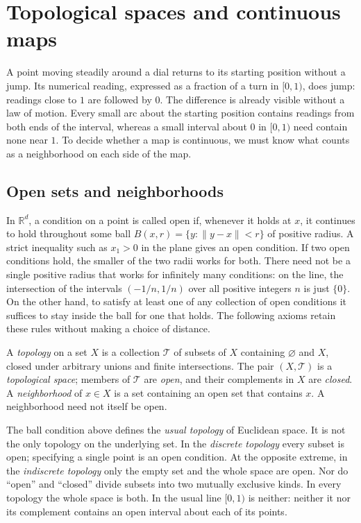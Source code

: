 \chapter{Topological spaces and continuous maps}\label{f:topology}

A point moving steadily around a dial returns to its starting position without a jump. Its numerical reading, expressed as a fraction of a turn in $[0,1)$, does jump: readings close to $1$ are followed by $0$. The difference is already visible without a law of motion. Every small arc about the starting position contains readings from both ends of the interval, whereas a small interval about $0$ in $[0,1)$ need contain none near $1$. To decide whether a map is continuous, we must know what counts as a neighborhood on each side of the map.

\section{Open sets and neighborhoods}

In $\mathbb R^d$, a condition on a point is called open if, whenever it holds at $x$, it continues to hold throughout some ball $B(x,r)=\{y:\|y-x\|<r\}$ of positive radius. A strict inequality such as $x_1>0$ in the plane gives an open condition. If two open conditions hold, the smaller of the two radii works for both. There need not be a single positive radius that works for infinitely many conditions: on the line, the intersection of the intervals $(-1/n,1/n)$ over all positive integers $n$ is just $\{0\}$. On the other hand, to satisfy at least one of any collection of open conditions it suffices to stay inside the ball for one that holds. The following axioms retain these rules without making a choice of distance.

\begin{definition}\label{f:top-open}
A \emph{topology} on a set $X$ is a collection $\mathcal T$ of subsets of $X$ containing $\varnothing$ and $X$, closed under arbitrary unions and finite intersections. The pair $(X,\mathcal T)$ is a \emph{topological space}; members of $\mathcal T$ are \emph{open}, and their complements in $X$ are \emph{closed}. A \emph{neighborhood} of $x\in X$ is a set containing an open set that contains $x$. A neighborhood need not itself be open.
\end{definition}

The ball condition above defines the \emph{usual topology} of Euclidean space. It is not the only topology on the underlying set. In the \emph{discrete topology} every subset is open; specifying a single point is an open condition. At the opposite extreme, in the \emph{indiscrete topology} only the empty set and the whole space are open. Nor do ``open'' and ``closed'' divide subsets into two mutually exclusive kinds. In every topology the whole space is both. In the usual line $[0,1)$ is neither: neither it nor its complement contains an open interval about each of its points.

